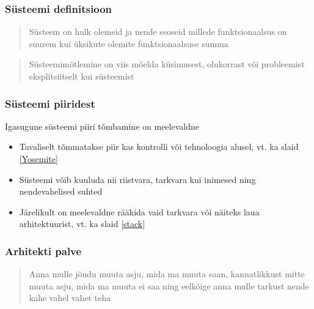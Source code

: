 \begin{frame}[fragile]
  \frametitle{Süsteemi definitsioon}
		\begin{center}
  			\begin{quote}
				Süsteem on hulk olemeid ja nende seoseid millede funktsionaalsus on suurem kui üksikute olemite funktsionaalsuse summa
			\end{quote}
			\begin{quote}
				Süsteemimõtlemine on viis mõelda küsimusest, olukorrast või probleemist eksplitsiitselt kui süsteemist
			\end{quote}
		\end{center}
		\cite{crawley2015systems}
\end{frame}

\begin{frame}[fragile]
  \frametitle{Süsteemi piiridest}
		Igasugune süsteemi piiri tõmbamine on meelevaldne
		\begin{itemize}
			\item Tavaliselt tõmmatakse piir kas kontrolli või tehnoloogia alusel, vt. ka slaid \ref{Yosemite}
			\item Süsteemi võib kuuluda nii riistvara, tarkvara kui inimesed ning nendevahelised suhted
			\item Järelikult on meelevaldne rääkida vaid tarkvara või näiteks laua arhitektuurist, vt. ka slaid \ref{stack}
		\end{itemize}

\end{frame}

\begin{frame}[fragile]
  \frametitle{Arhitekti palve}
		\begin{center}
  			\begin{quote}
				Anna mulle jõudu muuta asju, mida ma muuta saan, kannatlikkust mitte muuta asju, mida ma muuta ei saa ning eelkõige anna mulle tarkust nende kahe vahel vahet teha
			\end{quote}
		\end{center}
\end{frame}

